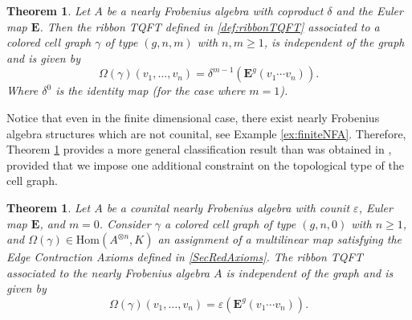 \documentclass{amsart}
\newcommand{\be}{\begin{equation}}
\newcommand{\ee}{\end{equation}}
\newcommand{\tensor}{\otimes}
\newcommand{\Hom}{\mathrm{Hom}}
\newcommand{\eps}{\varepsilon}
\newcommand{\bige}{\mathbf{E}}
\newtheorem{Thm}[Lem]{Theorem}
\theoremstyle{definition}
\begin{document}
\begin{Thm}\label{thm B}
    Let $A$ be a nearly Frobenius algebra with coproduct $\delta$ and the Euler map $\bige$. Then the {\it ribbon TQFT} defined in \ref{def:ribbonTQFT} associated to a colored cell graph $\gamma$ of type $(g,n,m)$ with $n,m\geq 1$, is independent of the graph and is given by  
    \be
    \Omega(\gamma)(v_1,\ldots,v_n)=\delta^{m-1}(\bige^g(v_1\cdots v_n)).
    \ee
    Where $\delta^0$ is the identity map (for the case where $m=1$).
\end{Thm}
Notice that even in the finite dimensional case, there exist nearly Frobenius algebra structures which are not counital, see Example \ref{ex:finiteNFA}. Therefore, Theorem \ref{thm B} provides a more general classification result than was obtained in \cite{DaDu}, provided that we impose one additional constraint on the topological type of the cell graph.
\begin{Thm}\label{prop:1.2}
    Let $A$ be a counital nearly Frobenius algebra with counit $\eps$, Euler map $\bige$, and $m=0$. Consider $\gamma$ a colored cell graph of type $(g,n,0)$ with $n\geq 1$, and $\Omega(\gamma)\in\Hom(A^{\tensor n},K)$ an assignment of a multilinear map satisfying the Edge Contraction Axioms defined in \ref{SecRedAxioms}. The ribbon TQFT associated to the nearly Frobenius algebra $A$ is independent of the graph and is given by
    \be
    \Omega(\gamma)(v_1,\ldots,v_n)=\eps(\bige^g(v_1\cdots v_n)).
    \ee
\end{Thm}
\end{document}
